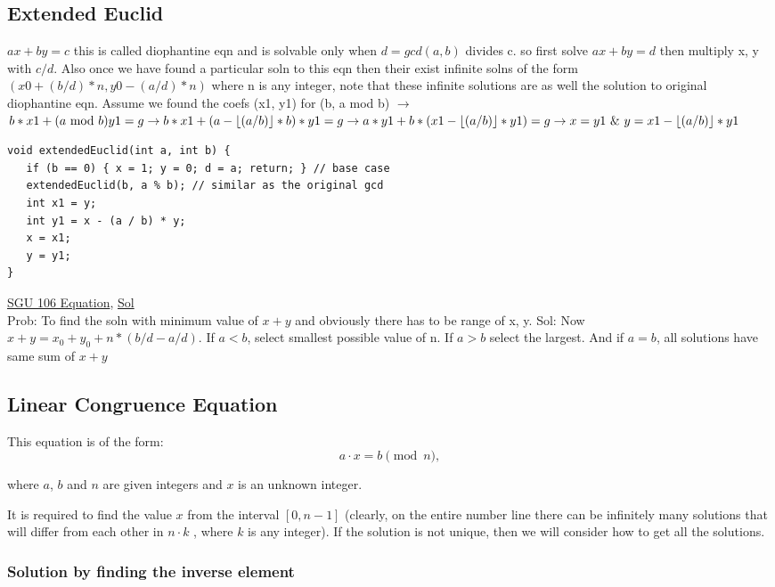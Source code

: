 \documentclass[8pt, a4paper, oneside, twocolumn]{extarticle}
\begin{document}
\subsection{Extended Euclid}
$ax + by = c$ this is called diophantine eqn and is solvable only when $d = gcd(a, b)$ divides c. so first solve $ax + by = d$ then multiply x, y with $c / d$. Also once we have found a particular soln to this eqn then their exist infinite solns of the form $(x0 + (b/d)*n, y0 - (a/d)*n)$ where n is any integer, note that these infinite solutions are as well the solution to original diophantine eqn. Assume we found the coefs (x1, y1) for (b, a mod b) $\rightarrow$ $b*x1 + (a\text{ mod }b)y1 = g\\ \rightarrow b*x1 + (a - \lfloor(a/b)\rfloor*b)*y1=g\\
\rightarrow a*y1 + b*(x1 - \lfloor (a/b)\rfloor * y1) = g\\
\rightarrow x = y1\text{ \& }y = x1 - \lfloor (a/b)\rfloor*y1$
\begin{verbatim}
void extendedEuclid(int a, int b) {
   if (b == 0) { x = 1; y = 0; d = a; return; } // base case
   extendedEuclid(b, a % b); // similar as the original gcd
   int x1 = y;
   int y1 = x - (a / b) * y;
   x = x1;
   y = y1;
}
\end{verbatim}
\href{https://codeforces.com/problemsets/acmsguru/problem/99999/106}{SGU 106 Equation}, \href{https://github.com/sourabh2311/Competitive-Programming/blob/master/IMP%20QUES/Extended%20Euclid/106-The%20Equation.cpp}{Sol}
\\Prob: To find the soln with minimum value of $x + y$ and obviously there has to be range of x, y. Sol: Now $x + y = x_0 + y_0 + n * (b/d - a/d)$. If $a < b$, select smallest possible value of n. If $a > b$ select the largest. And if $a = b$, all solutions have same sum of $x + y$
\subsection{Linear Congruence Equation}
This equation is of the form:
$$a \cdot x = b \pmod n,$$

where $a$, $b$ and $n$ are given integers and $x$ is an unknown integer.

It is required to find the value $x$ from the interval $[0, n-1]$ (clearly, on the entire number line there can be infinitely many solutions that will differ from each other in $n \cdot k$ , where $k$ is any integer). If the solution is not unique, then we will consider how to get all the solutions.
\subsubsection{Solution by finding the inverse element}
\end{document}
